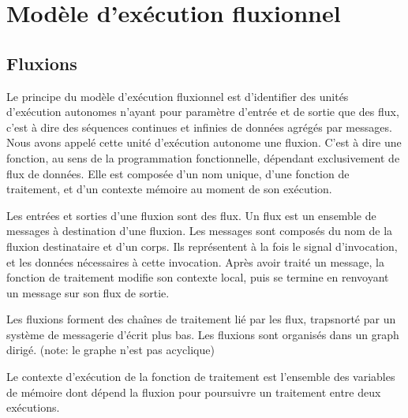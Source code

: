 \section{Modèle d'exécution fluxionnel}

\subsection{Fluxions}

Le principe du modèle d'exécution fluxionnel est d'identifier des unités d'exécution autonomes n'ayant pour paramètre d'entrée et de sortie que des flux, c'est à dire des séquences continues et infinies de données agrégés par messages.
Nous avons appelé cette unité d'exécution autonome une fluxion.
C'est à dire une fonction, au sens de la programmation fonctionnelle, dépendant exclusivement de flux de données.
Elle est composée d'un nom unique, d'une fonction de traitement, et d'un contexte mémoire au moment de son exécution.

Les entrées et sorties d'une fluxion sont des flux.
Un flux est un ensemble de messages à destination d'une fluxion.
Les messages sont composés du nom de la fluxion destinataire et d'un corps.
Ils représentent à la fois le signal d'invocation, et les données nécessaires à cette invocation.
Après avoir traité un message, la fonction de traitement modifie son contexte local, puis se termine en renvoyant un message sur son flux de sortie.

Les fluxions forment des chaînes de traitement lié par les flux, trapsnorté par un système de messagerie d'écrit plus bas.
Les fluxions sont organisés dans un graph dirigé. (note: le graphe n'est pas acyclique)

Le contexte d'exécution de la fonction de traitement est l'ensemble des variables de mémoire dont dépend la fluxion pour poursuivre un traitement entre deux exécutions.


